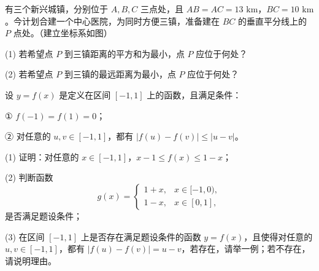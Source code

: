 \begin{question}
有三个新兴城镇，分别位于 \(A,B,C\) 三点处，且 \(AB=AC=13\text{ km}\)，\(BC=10\text{ km}\)。今计划合建一个中心医院，为同时方便三镇，准备建在 \(BC\) 的垂直平分线上的 \(P\) 点处。（建立坐标系如图）

(1) 若希望点 \(P\) 到三镇距离的平方和为最小，点 \(P\) 应位于何处？

(2) 若希望点 \(P\) 到三镇的最远距离为最小，点 \(P\) 应位于何处？
\nopagebreak[4]
\begin{center}\end{center}
\nopagebreak[4]
\end{question}
\begingroup
\renewenvironment{question}{\Needspace{0.25\textheight}}{}
\begin{question}

设 \(y=f(x)\) 是定义在区间 \([-1,1]\) 上的函数，且满足条件：

① \(f(-1)=f(1)=0\)；

② 对任意的 \(u,v\in[-1,1]\)，都有 \(|f(u)-f(v)|\leq|u-v|\)。

(1) 证明：对任意的 \(x\in[-1,1]\)，\(x-1\leq f(x)\leq1-x\)；

(2) 判断函数
\nopagebreak[4]
\[
g(x)=\begin{cases}
1+x,&x\in[-1,0),\\
1-x,&x\in[0,1],
\end{cases}
\]
是否满足题设条件；

(3) 在区间 \([-1,1]\) 上是否存在满足题设条件的函数 \(y=f(x)\)，且使得对任意的 \(u,v\in[-1,1]\)，都有 \(|f(u)-f(v)|=u-v\)，若存在，请举一例；若不存在，请说明理由。

\end{question}
\endgroup
